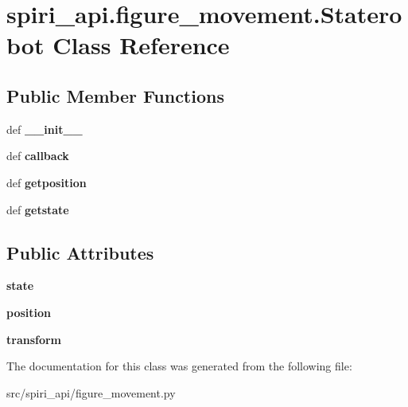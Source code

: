 \hypertarget{classspiri__api_1_1figure__movement_1_1_staterobot}{\section{spiri\-\_\-api.\-figure\-\_\-movement.\-Staterobot \-Class \-Reference}
\label{classspiri__api_1_1figure__movement_1_1_staterobot}
}
\subsection*{\-Public \-Member \-Functions}
\begin{DoxyCompactItemize}
\item 
\hypertarget{classspiri__api_1_1figure__movement_1_1_staterobot_a4bca047e67a87ef60147caa3bec0bfa5}{def {\bfseries \-\_\-\-\_\-init\-\_\-\-\_\-}}\label{classspiri__api_1_1figure__movement_1_1_staterobot_a4bca047e67a87ef60147caa3bec0bfa5}

\item 
\hypertarget{classspiri__api_1_1figure__movement_1_1_staterobot_a321456867de643d09326b856aeec975b}{def {\bfseries callback}}\label{classspiri__api_1_1figure__movement_1_1_staterobot_a321456867de643d09326b856aeec975b}

\item 
\hypertarget{classspiri__api_1_1figure__movement_1_1_staterobot_a745991fc1e78f37812e0065ea177ec53}{def {\bfseries getposition}}\label{classspiri__api_1_1figure__movement_1_1_staterobot_a745991fc1e78f37812e0065ea177ec53}

\item 
\hypertarget{classspiri__api_1_1figure__movement_1_1_staterobot_aa92049eb8526decb28cfa8d34aaa6043}{def {\bfseries getstate}}\label{classspiri__api_1_1figure__movement_1_1_staterobot_aa92049eb8526decb28cfa8d34aaa6043}

\end{DoxyCompactItemize}
\subsection*{\-Public \-Attributes}
\begin{DoxyCompactItemize}
\item 
\hypertarget{classspiri__api_1_1figure__movement_1_1_staterobot_a4d90806cff95d3d017c2f4d9fab7a985}{{\bfseries state}}\label{classspiri__api_1_1figure__movement_1_1_staterobot_a4d90806cff95d3d017c2f4d9fab7a985}

\item 
\hypertarget{classspiri__api_1_1figure__movement_1_1_staterobot_afd0825ebbcdfd52b9f657eacb963fac1}{{\bfseries position}}\label{classspiri__api_1_1figure__movement_1_1_staterobot_afd0825ebbcdfd52b9f657eacb963fac1}

\item 
\hypertarget{classspiri__api_1_1figure__movement_1_1_staterobot_a209e6b31c2ff32bed6870249163849c7}{{\bfseries transform}}\label{classspiri__api_1_1figure__movement_1_1_staterobot_a209e6b31c2ff32bed6870249163849c7}

\end{DoxyCompactItemize}


\-The documentation for this class was generated from the following file\-:\begin{DoxyCompactItemize}
\item 
src/spiri\-\_\-api/figure\-\_\-movement.\-py\end{DoxyCompactItemize}
